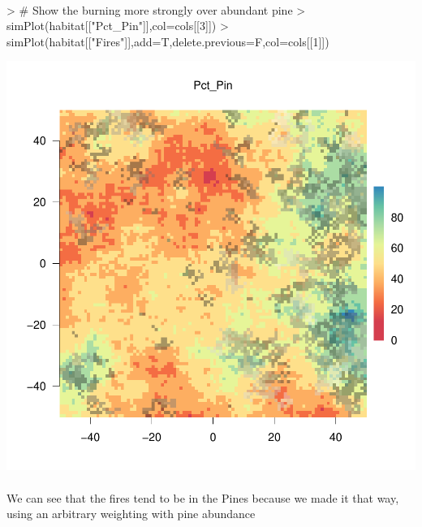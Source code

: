 \documentclass{article}
\begin{document}
\paragraph{}

\begin{Schunk}
\begin{Sinput}
> # Show the burning more strongly over abundant pine
> simPlot(habitat[["Pct_Pin"]],col=cols[[3]])
> simPlot(habitat[["Fires"]],add=T,delete.previous=F,col=cols[[1]])
\end{Sinput}
\end{Schunk}
\includegraphics{introduction-fire-overlaid}


\paragraph{}
We can see that the fires tend to be in the Pines because we made it that way, using an arbitrary weighting with pine abundance
\end{document}
